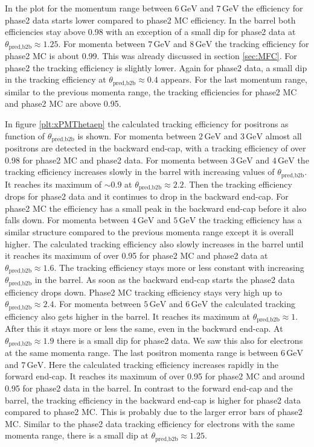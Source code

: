 \documentclass[a4paper,11pt,twosided,final,german,openbib,pdftex,listof=totoc,bibliography=totoc]{scrbook}
\begin{document}
In the plot for the momentum range between $6\,\textrm{GeV}$ and $7\,\textrm{GeV}$ the efficiency for phase2 data starts lower compared to phase2 MC efficiency. In the barrel both efficiencies stay above 0.98 with an exception of a small dip for phase2 data at $\theta_{\textrm{pred,b2b}} \approx 1.25$. 
For momenta  between $7\,\textrm{GeV}$ and $8\,\textrm{GeV}$ the tracking efficiency for phase2 MC is about 0.99. This was already discussed in section \ref{sec:MFC}. For phase2 the tracking efficiency is slightly lower. Again for phase2 data, a small dip in the tracking efficiency at $\theta_{\textrm{pred,b2b}} \approx 0.4$ appears. 
For the last momentum range, similar to the previous momenta range, the tracking efficiencies for phase2 MC and phase2 MC are above 0.95.
 

In figure \ref{plt:xPMThetaep} the calculated tracking efficiency for positrons as function of $\theta_{\textrm{pred,b2b}}$ is shown. For momenta between $2\,\textrm{GeV}$ and $3\,\textrm{GeV}$ almost all positrons are detected in the backward end-cap, with a tracking efficiency of over 0.98 for phase2 MC and phase2 data. 
For momenta between $3\,\textrm{GeV}$ and $4\,\textrm{GeV}$ the tracking efficiency increases slowly in the barrel with increasing values of $\theta_{\textrm{pred,b2b}}$. It reaches its maximum of $\sim 0.9$ at $\theta_{\textrm{pred,b2b}} \approx 2.2$. Then the tracking efficiency drops for phase2 data and it continues to drop in the backward end-cap. For phase2 MC the efficiency has a small peak in the backward end-cap before it also falls down. 
For momenta between $4\,\textrm{GeV}$ and $5\,\textrm{GeV}$ the tracking efficiency has a similar structure compared to the previous momenta range except it is overall higher. The calculated tracking efficiency also slowly increases in the barrel until it reaches its maximum of over 0.95 for phase2 MC and phase2 data at $\theta_{\textrm{pred,b2b}} \approx 1.6$. The tracking efficiency stays more or less constant with increasing $\theta_{\textrm{pred,b2b}}$ in the barrel. As soon as the backward end-cap starts the phase2 data efficiency drops down. Phase2 MC tracking efficiency stays very high up to $\theta_{\textrm{pred,b2b}} \approx 2.4$.
For momenta between $5\,\textrm{GeV}$ and $6\,\textrm{GeV}$ the calculated tracking efficiency also gets higher in the barrel. It reaches its maximum at $\theta_{\textrm{pred,b2b}} \approx 1$. After this it stays more or less the same, even in the backward end-cap. At $\theta_{\textrm{pred,b2b}} \approx 1.9$ there is a small dip for phase2 data. We saw this also for electrons at the same momenta range.
The last positron momenta range is between $6\,\textrm{GeV}$ and $7\,\textrm{GeV}$. Here the calculated tracking efficiency increases rapidly in the forward end-cap. It reaches its maximum of over 0.95 for phase2 MC and around 0.95 for phase2 data in the barrel. In contrast to the forward end-cap and the barrel, the tracking efficiency in the backward end-cap is higher for phase2 data compared to phase2 MC. This is probably due to the larger error bars of phase2 MC. Similar to the phase2 data tracking efficiency for electrons with the same momenta range, there is a small dip at $\theta_{\textrm{pred,b2b}} \approx 1.25$.
\end{document}
